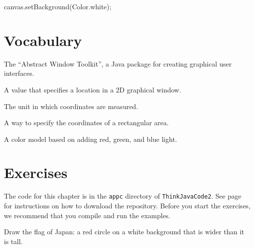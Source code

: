 \begin{code}
canvas.setBackground(Color.white);
\end{code}


\section{Vocabulary}

\begin{description}

The ``Abstract Window Toolkit'', a Java package for creating graphical user interfaces.

A value that specifies a location in a 2D graphical window.

The unit in which coordinates are measured.

A way to specify the coordinates of a rectangular area.

A color model based on adding red, green, and blue light.

\end{description}


\section{Exercises}

The code for this chapter is in the {\tt appc} directory of {\tt ThinkJavaCode2}.
See page~\pageref{code} for instructions on how to download the repository.
Before you start the exercises, we recommend that you compile and run the examples.


\begin{exercise}

Draw the flag of Japan: a red circle on a white background that is wider than it is tall.

\end{exercise}


